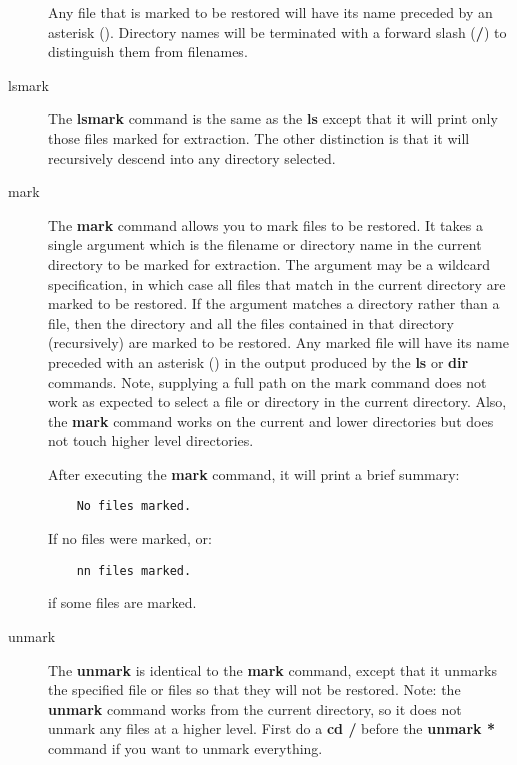 \begin{description}
   Any file that is marked to be restored will  have its name preceded by an
   asterisk ({\bf *}). Directory names  will be terminated with a forward slash
   ({\bf /}) to distinguish them  from filenames.

\item [lsmark]
   The {\bf lsmark} command is the same as the  {\bf ls} except that it will
   print only those files marked for  extraction. The other distinction is that
   it will recursively  descend into any directory selected.

\item [mark]
   The {\bf mark} command allows you to mark files to be restored. It takes a
   single argument which is the filename  or directory name in the current
   directory to be marked for extraction.  The argument may be a wildcard
   specification, in which  case all files that match in the current directory
   are marked to be  restored. If the argument matches a directory rather than a
   file,  then the directory and all the files contained in that directory
   (recursively)  are marked to be restored. Any marked file will have its name
   preceded with an asterisk ({\bf *}) in the output produced by the  {\bf ls}
or
   {\bf dir} commands. Note, supplying a full path on  the mark command does not
   work as expected to select a file or  directory in the current directory.
   Also, the {\bf mark} command works  on the current and lower directories but
   does not touch higher level  directories.

   After executing the {\bf mark} command, it will print a brief summary:

\footnotesize
\begin{verbatim}
    No files marked.

\end{verbatim}
\normalsize

   If no files were marked, or:

\footnotesize
\begin{verbatim}
    nn files marked.

\end{verbatim}
\normalsize

   if some files are marked.

\item [unmark]
   The {\bf unmark} is identical to the {\bf mark}  command, except that it
   unmarks the specified file or files so that  they will not be restored. Note:
   the {\bf unmark} command works from  the current directory, so it does not
   unmark any files at a higher  level. First do a {\bf cd /} before the {\bf
   unmark *} command if  you want to unmark everything.


\end{description}
